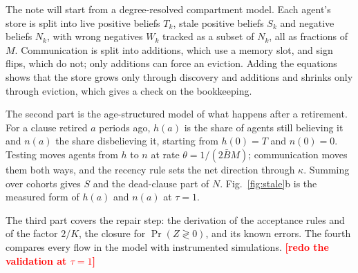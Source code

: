 \documentclass[11pt]{article}
\newcommand{\todo}[1]{\textcolor{red}{\textbf{[#1]}}}
\begin{document}
The note will start from a degree-resolved compartment model. Each agent's store is split into live positive beliefs $T_k$, stale positive beliefs $S_k$ and negative beliefs $N_k$, with wrong negatives $W_k$ tracked as a subset of $N_k$, all as fractions of $M$. Communication is split into additions, which use a memory slot, and sign flips, which do not; only additions can force an eviction. Adding the equations shows that the store grows only through discovery and additions and shrinks only through eviction, which gives a check on the bookkeeping.

The second part is the age-structured model of what happens after a retirement. For a clause retired $a$ periods ago, $h(a)$ is the share of agents still believing it and $n(a)$ the share disbelieving it, starting from $h(0) = T$ and $n(0) = 0$. Testing moves agents from $h$ to $n$ at rate $\theta = 1/(2\bar B M)$; communication moves them both ways, and the recency rule sets the net direction through $\kappa$. Summing over cohorts gives $S$ and the dead-clause part of $N$. Fig.~\ref{fig:stale}b is the measured form of $h(a)$ and $n(a)$ at $\tau = 1$.

The third part covers the repair step: the derivation of the acceptance rules and of the factor $2/K$, the closure for $\Pr(Z \gtrless 0)$, and its known errors. The fourth compares every flow in the model with instrumented simulations. \todo{redo the validation at $\tau = 1$}
\end{document}

